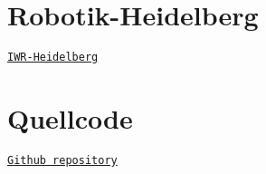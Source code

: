 \hypertarget{Verlinkungen_Robotik-Heidelberg}{}\section{Robotik-\/\-Heidelberg}\label{Verlinkungen_Robotik-Heidelberg}
\href{http://joanna.iwr.uni-heidelberg.de/rlab/de/home}{\tt I\-W\-R-\/\-Heidelberg} \hypertarget{Verlinkungen_Quellcode}{}\section{Quellcode}\label{Verlinkungen_Quellcode}
\href{https://github.com/feliwir/laufmassenwaage-B}{\tt Github repository} 